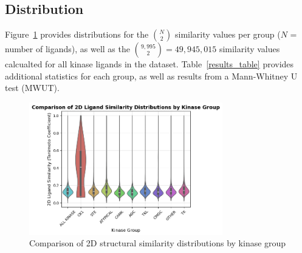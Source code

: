\documentclass[11pt]{article}
\begin{document}
\subsection*{Distribution}

Figure~\ref{violin_plot} provides distributions for the ${N\choose 2}$ similarity values per group ($N$ = number of ligands), as well as the ${9,995 \choose 2} = 49,945,015$ similarity values calcualted for all kinase ligands in the dataset. Table~\ref{results_table} provides additional statistics for each group, as well as results from a Mann-Whitney U test (MWUT).
\begin{figure}
    \centering
    \includegraphics[width=0.75\textwidth]{../figures/violin_plot.png}
    \caption{Comparison of 2D structural similarity distributions by kinase group}
    \label{violin_plot}
\end{figure}
\end{document}
